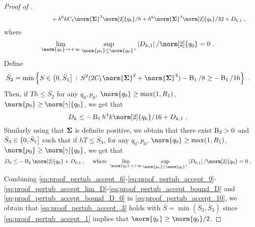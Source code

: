\begin{proof}[Proof of ]
\begin{align}
      &  \qquad \qquad\qquad \qquad+  h^6 k C_1 \norm{\Sigmabf}^2 \norm[2]{q_k}/8 +  h^6 \norm{\Sigmabf}^4 \norm[2]{q_k}/32     + D_{k,1} \eqsp,
\end{align}
where
\begin{equation}
\label{eq:proof_pertub_accept_lim_D}
    \lim_{\norm{q_0} \to \plusinfty} \sup_{\norm{p_0} \leq \norm{q_0}^\gamma} \abs{D_{k,1}}/\norm[2]{q_0} =0\eqsp.
  \end{equation}
  Define
  \begin{equation}
\label{eq:proof_pertub_accept_def_S_2}
    \bar{S}_2 = \min\defEns{ S \in \ocint{0,\bar{S}_1} \, : \, S^2 ( 2 C_1  \norm{\Sigmabf}^2 + \norm{\Sigmabf}^4)  - \BB_1/8 \geq -\BB_1/16} \eqsp.
  \end{equation}
  Then, if $Th \leq \bar{S_2}$ for any  $q_0,p_0$, $\norm{q_0} \geq \max(1,R_1)$, $\norm{p_0} \geq \norm[\gamma]{q_0}$, we get that
  \begin{equation}
\label{eq:proof_pertub_accept_bound_D}
    D_k \leq -\BB_1h^4 k \norm[2]{q_k}/16 + D_{k,1} \eqsp.
  \end{equation}
  Similarly using that $\boldsymbol{\Sigma}$ is definite positive, we obtain that there exist $\operatorname{B}_2 >0$ and  $\bar{S}_3  \in \left(0,\bar{S}_1\right]$ such that if $hT \leq \bar{S}_3$, for any  $q_0,p_0$, $\norm{q_0} \geq \max(1,R_1)$, $\norm{p_0} \geq \norm[\gamma]{q_0}$, we get that
  \begin{equation}
\label{eq:proof_pertub_accept_bound_D_0}
    D_0 \leq -\BB_2 \norm[2]{q_0} + D_{0,1} \eqsp,
 \quad \text{   where }
    \lim_{\norm{q_0} \to \plusinfty} \sup_{\norm{p_0} \leq \norm{q_0}^\gamma} \abs{D_{0,1}}/\norm[2]{q_0} =0\eqsp.
  \end{equation}
  Combining \eqref{eq:proof_pertub_accept_6}-\eqref{eq:proof_pertub_accept_9}-\eqref{eq:proof_pertub_accept_lim_D}-\eqref{eq:proof_pertub_accept_bound_D} and \eqref{eq:proof_pertub_accept_bound_D_0} in \eqref{eq:proof_pertub_accept_10}, we obtain that \eqref{eq:proof_pertub_accept_3} holds with $\bar{S} = \min(\bar{S}_2,\bar{S}_3)$ since \eqref{eq:proof_pertub_accept_1} implies that  $\norm{q_k} \geq \norm{q_0}/2$.
\end{proof}

